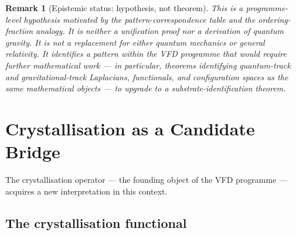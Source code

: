\documentclass[12pt]{article}
\newtheorem{remark}[theorem]{Remark}
\begin{document}
\begin{remark}[Epistemic status: hypothesis, not theorem]
This is a programme-level hypothesis motivated by the pattern-correspondence table and the ordering-fraction analogy. It is neither a unification proof nor a derivation of quantum gravity. It is not a replacement for either quantum mechanics or general relativity. It identifies a pattern within the VFD programme that would require further mathematical work --- in particular, theorems identifying quantum-track and gravitational-track Laplacians, functionals, and configuration spaces as the same mathematical objects --- to upgrade to a substrate-identification theorem.
\end{remark}

\section{Crystallisation as a Candidate Bridge}\label{sec:crystallisation}

The crystallisation operator --- the founding object of the VFD programme --- acquires a new interpretation in this context.

\subsection{The crystallisation functional}
\end{document}
